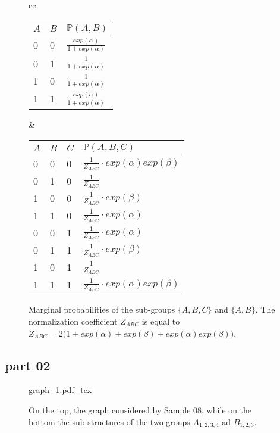 \begin{figure}
\begin{tabular}{cc}
\begin{minipage}[t]{0.45 \columnwidth}
\begin{tabular}{|l|l|l|}
$A$ & $B$ & $\mathbb{P}(A,B)$ \\
\hline
0 & 0 & $\frac{exp(\alpha)}{1+exp(\alpha)}$ \\
\hline
0 & 1 & $\frac{1}{1+exp(\alpha)}$ \\
\hline
1 & 0 & $\frac{1}{1+exp(\alpha)}$ \\
\hline
1 & 1 & $\frac{exp(\alpha)}{1+exp(\alpha)}$ \\
\hline
\end{tabular}
\end{minipage} 
 & 
\begin{minipage}[t]{0.45 \columnwidth}
\begin{tabular}{|l|l|l|l|}
$A$ & $B$ & $C$ & $\mathbb{P}(A,B,C)$ \\
\hline
0 & 0 & 0 & $\frac{1}{Z_{ABC}} \cdot exp(\alpha)exp(\beta)$ \\
\hline
0 & 1 & 0 & $\frac{1}{Z_{ABC}}$ \\
\hline
1 & 0 & 0 & $\frac{1}{Z_{ABC}} \cdot exp(\beta)$ \\
\hline
1 & 1 & 0 & $\frac{1}{Z_{ABC}} \cdot exp(\alpha)$ \\
\hline
0 & 0 & 1 & $\frac{1}{Z_{ABC}} \cdot exp(\alpha)$ \\
\hline
0 & 1 & 1 & $\frac{1}{Z_{ABC}} \cdot exp(\beta)$ \\
\hline
1 & 0 & 1 & $\frac{1}{Z_{ABC}}$ \\
\hline
1 & 1 & 1 & $\frac{1}{Z_{ABC}} \cdot exp(\alpha)exp(\beta)$ \\
\hline
\end{tabular}
\end{minipage} 
\end{tabular}
\caption{Marginal probabilities of the sub-groups $\lbrace A,B,C \rbrace$ and $\lbrace A,B \rbrace$. The normalization coefficient $Z_{ABC}$ is equal to $Z_{ABC}=2 \bigg( 1 + exp(\alpha)+ exp(\beta) + exp(\alpha)exp(\beta) \bigg)$. }
\label{tab:sample_08:marg}
\end{figure}

\subsection{part 02}

\begin{figure}
	\centering
\def\svgwidth{0.85 \textwidth}
{graph_1.pdf_tex} 
\caption{On the top, the graph considered by Sample 08, while on the bottom the sub-structures of the two groups $A_{1,2,3,4}$ ad $B_{1,2,3}$. }
\label{fig:sample_08:0}
\end{figure}

